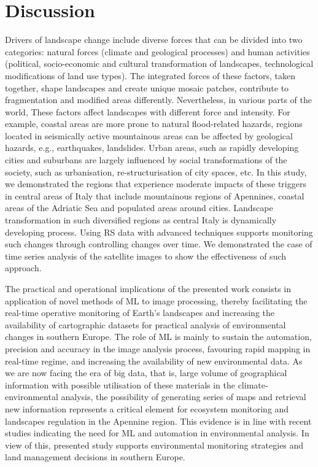 \documentclass[jimaging,article,accept,pdftex,oneauthor]{Definitions/mdpi}
\begin{document}
\section{Discussion}

{Drivers of landscape change include diverse forces that can be divided into two categories: natural forces (climate and geological processes) and human activities (political, socio-economic and cultural transformation of landscapes, technological modifications of land use types). The integrated forces of these factors, taken together, shape landscapes and create unique mosaic patches, contribute to fragmentation and modified areas differently. Nevertheless, in various parts of the world, These factors affect landscapes with different force and intensity. For example, coastal areas are more prone to natural flood-related hazards, regions located in seismically active mountainous areas can be affected by geological hazards, e.g., earthquakes, landslides. Urban areas, such as rapidly developing cities and suburbans are largely influenced by social transformations of the society, such as urbanisation, re-structurisation of city spaces, etc. In this study, we demonstrated the regions that experience moderate impacts of these triggers in central areas of Italy that include mountainous regions of Apennines, coastal areas of the Adriatic Sea and populated areas around cities. Landscape transformation in such diversified regions as central Italy is dynamically developing process. Using RS data with advanced techniques supports monitoring such changes through controlling changes over time. We demonstrated the case of time series analysis of the satellite images to show the effectiveness of such approach. }

{The practical and operational implications of the presented work consists in application of novel methods of ML to image processing, thereby facilitating the real-time operative monitoring of Earth's landscapes and increasing the availability of cartographic datasets for practical analysis of environmental changes in southern Europe. The role of ML is mainly to sustain the automation, precision and accuracy in the image analysis process, favouring rapid mapping in real-time regime, and increasing the availability of new environmental data. As we are now facing the era of big data, that is, large volume of geographical information with possible utilisation of these materials in the climate-environmental analysis, the possibility of generating series of maps and retrieval new information  represents a critical element for ecosystem monitoring and landscapes regulation in the Apennine region. This evidence is in line with recent studies indicating the need for ML and automation in environmental analysis. In view of this, presented study supports environmental monitoring strategies and land management decisions in southern Europe. }
\end{document}
